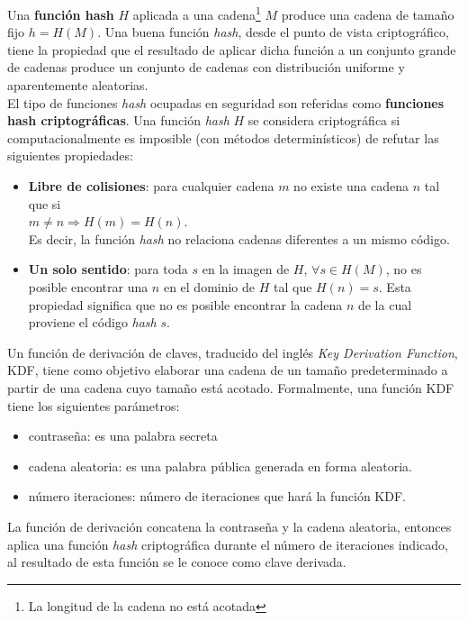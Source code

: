 Una \textbf{función hash} $H$ aplicada a una cadena\footnote{La longitud de la cadena no está acotada} $M$ produce una cadena de tamaño fijo $h=H(M)$. Una buena función \textit{hash}, desde el punto de vista criptográfico, tiene la propiedad que el resultado de aplicar dicha función a un conjunto grande de cadenas produce un conjunto de cadenas con distribución uniforme y aparentemente aleatorias\cite{CryptographyNetworkSecurity}.\\
El tipo de funciones \textit{hash} ocupadas en seguridad son referidas como \textbf{funciones hash criptográficas}. Una función \textit{hash} $H$ se considera criptográfica si computacionalmente es imposible (con métodos determinísticos) de refutar las siguientes propiedades\cite{CryptographyNetworkSecurity}:
\begin{itemize}
	\item \textbf{Libre de colisiones}: para cualquier cadena $m$ no existe una cadena $n$ tal que si\\
	$m \neq n \Rightarrow H(m) = H(n)$.\\
	Es decir, la función \textit{hash} no relaciona cadenas diferentes a un mismo código.
	\item \textbf{Un solo sentido}: para toda $s$ en la imagen de $H$, $\forall s \in H(M)$, no es posible encontrar una $n$ en el dominio de $H$ tal que $H(n) = s$. Esta propiedad significa que no es posible encontrar la cadena $n$ de la cual proviene el código \textit{hash} $s$.
\end{itemize}
Un función de derivación de claves, traducido del inglés \textit{Key Derivation Function}, KDF, tiene como objetivo elaborar una cadena de un tamaño predeterminado a partir de una cadena cuyo tamaño está acotado. Formalmente, una función KDF tiene los siguientes parámetros\cite{UnderstandingCryptography, CryptographyTheoryPractice}:
\begin{itemize}
	\item contraseña: es una palabra secreta
	\item cadena aleatoria: es una palabra pública generada en forma aleatoria.
	\item número iteraciones: número de iteraciones que hará la función KDF.
\end{itemize}
La función de derivación concatena la contraseña y la cadena aleatoria, entonces aplica una función \textit{hash} criptográfica durante el número de iteraciones indicado, al resultado de esta función se le conoce como clave derivada\cite{UnderstandingCryptography, CryptographyTheoryPractice}.

